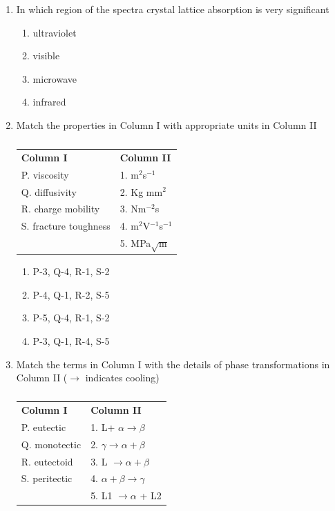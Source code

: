 \documentclass[a4paper,10pt]{article}
\begin{document}
\begin{enumerate}
\item In which region of the spectra crystal lattice absorption is very significant
\hfill{}

\begin{multicols}{4}
\begin{enumerate}
\item ultraviolet
\item visible
\item microwave
\item infrared
\end{enumerate}
\end{multicols}

\item Match the properties in Column I with appropriate units in Column II
\begin{table}[H]
\centering
\begin{tabular}{ll}
\textbf{Column I} & \textbf{Column II} \\
P. viscosity & 1. m$^2$s$^{-1}$ \\
Q. diffusivity & 2. Kg mm$^2$ \\
R. charge mobility & 3. Nm$^{-2}$s \\
S. fracture toughness & 4. m$^2$V$^{-1}$s$^{-1}$ \\
 & 5. MPa$\sqrt{\text{m}}$ \\
\end{tabular}
\caption*{}
\label{tab:q10_mat}
\end{table}
\hfill{}

\begin{multicols}{2}
\begin{enumerate}
\item P-3, Q-4, R-1, S-2
\item P-4, Q-1, R-2, S-5
\item P-5, Q-4, R-1, S-2
\item P-3, Q-1, R-4, S-5
\end{enumerate}
\end{multicols}

\item Match the terms in Column I with the details of phase transformations in Column II ($\rightarrow$ indicates cooling)
\begin{table}[H]
\centering
\begin{tabular}{ll}
\textbf{Column I} & \textbf{Column II} \\
P. eutectic & 1. L+ $\alpha \rightarrow \beta$ \\
Q. monotectic & 2. $\gamma \rightarrow \alpha + \beta$ \\
R. eutectoid & 3. L $\rightarrow \alpha + \beta$ \\
S. peritectic & 4. $\alpha + \beta \rightarrow \gamma$ \\
 & 5. L1 $\rightarrow \alpha$ + L2 \\
\end{tabular}
\caption*{}
\label{tab:q11_mat}
\end{table}
\hfill{}


\end{enumerate}
\end{document}
